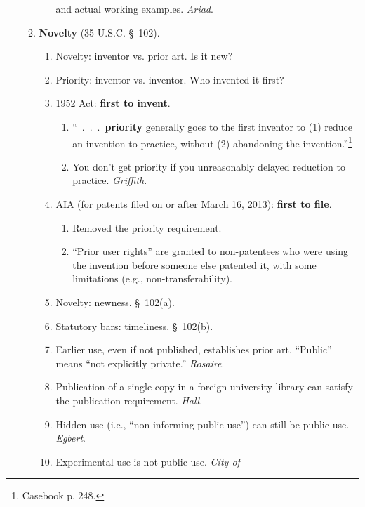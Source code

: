 \begin{enumerate}
\begin{enumerate}
\begin{enumerate}
            and actual working examples. \emph{Ariad}.
        \end{enumerate}
        \item \textbf{Novelty} (35 U.S.C. \S\ 102).
        \begin{enumerate}
            \item Novelty: inventor vs. prior art. Is it new?
            \item Priority: inventor vs. inventor. Who invented it first?
            \item 1952 Act: \textbf{first to invent}.
            \begin{enumerate}
                \item ``~.~.~.~\textbf{priority} generally goes to the first 
                inventor to (1) reduce an invention to practice, without (2) 
                abandoning the invention.''\footnote{Casebook p. 248.}
                \item You don't get priority if you unreasonably delayed 
                reduction to practice. \emph{Griffith}.
            \end{enumerate}
            \item AIA (for patents filed on or after March 16, 2013): 
            \textbf{first to file}.  \begin{enumerate}
                \item Removed the priority requirement.
                \item ``Prior user rights'' are granted to non-patentees who 
                were using the invention before someone else patented it, with 
                some limitations (e.g., non-transferability).
            \end{enumerate}
            \item Novelty: newness. \S\ 102(a).
            \item Statutory bars: timeliness. \S\ 102(b).
            \item Earlier use, even if not published, establishes prior art.  
            ``Public'' means ``not explicitly private.'' \emph{Rosaire}.
            \item Publication of a single copy in a foreign university library 
            can satisfy the publication requirement. \emph{Hall}.
            \item Hidden use (i.e., ``non-informing public use'') can still be 
            public use. \emph{Egbert}.
            \item Experimental use is not public use. \emph{City of 
}
\end{enumerate}
\end{enumerate}
\end{enumerate}
